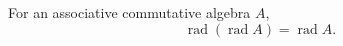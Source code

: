 For an associative commutative algebra $A$,
$$
\operatorname{rad}(\operatorname{rad} A) = \operatorname{rad} A.
$$
